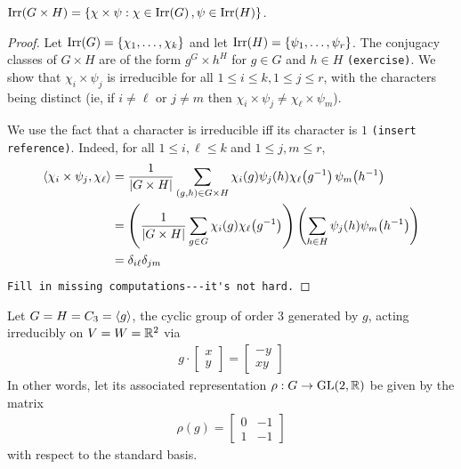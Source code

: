 \begin{boxtheorem}
    $\operatorname{Irr}\!\left( G \times H \right) = \left\{ \chi \times \psi : \chi \in \operatorname{Irr}\!\left( G \right), \psi \in \operatorname{Irr}\!\left( H \right) \right\}$.
\end{boxtheorem}
\begin{proof}
    Let $\operatorname{Irr}\!\left( G \right) = \left\{ \chi_1, \ldots, \chi_k \right\}$ and let $\operatorname{Irr}\!\left( H \right) = \left\{ \psi_1, \ldots, \psi_r \right\}$. The conjugacy classes of $G \times H$ are of the form $g^G \times h^H$ for $g \in G$ and $h \in H$ \verb|(exercise)|. We show that $\chi_i \times \psi_j$ is irreducible for all $1 \leq i \leq k, 1 \leq j \leq r$, with the characters being distinct (ie, if $i \neq \ell$ or $j \neq m$ then $\chi_i \times \psi_j \neq \chi_\ell \times \psi_m$).  %

    We use the fact that a character is irreducible iff its character is $1$ \verb|(insert reference)|. Indeed, for all $1 \leq i, \ell \leq k$ and $1 \leq j, m \leq r$,
    \begin{align*}
        \left\langle \chi_i \times \psi_j, \chi_\ell \right\rangle &= \frac{1}{\left\lvert G \times H \right\rvert} \sum_{(g, h) \in G \times H} \chi_i(g) \psi_j(h) \chi_\ell\!\left( g^{-1} \right)\psi_m\!\left( h^{-1} \right) \\
        &= \left( \frac{1}{\left\lvert G \times H \right\rvert} \sum_{g \in G} \chi_i(g) \chi_\ell\!\left( g^{-1} \right) \right) \left( \sum_{h \in H} \psi_j(h) \psi_m\!\left( h^{-1} \right) \right) \\
        &= \delta_{i\ell} \delta_{jm}
    \end{align*}
    \verb|Fill in missing computations---it's not hard.|
\end{proof}

\begin{boxexample}
    Let $G = H = C_3 = \left\langle g \right\rangle$, the cyclic group of order $3$ generated by $g$, acting irreducibly on $V = W = \mathbb{R}^2$ via
    \begin{align*}
        g \cdot \begin{bmatrix} x \\ y \end{bmatrix} = \begin{bmatrix} -y \\ xy \end{bmatrix}
    \end{align*}
    In other words, let its associated representation $\rho : G \to \operatorname{GL}\!\left( 2, \mathbb{R} \right)$ be given by the matrix
    \begin{align*}
        \rho(g) = \begin{bmatrix} 0 & -1 \\ 1 & -1 \end{bmatrix}
    \end{align*}
    with respect to the standard basis. 
\end{boxexample}

